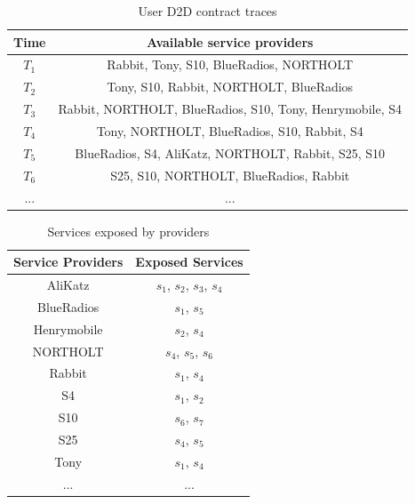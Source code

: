 \documentclass[journal]{IEEEtran}
\begin{document}
\begin{table}[!t]
\renewcommand{\arraystretch}{1.5}
\caption{User D2D contract traces}
\label{D2D contract traces}
\centering
\begin{tabular}{c c}
\hline
\bfseries Time & \bfseries Available service providers\\
\hline
$T_1$ & Rabbit, Tony, S10, BlueRadios, NORTHOLT\\
$T_2$ & Tony, S10, Rabbit, NORTHOLT, BlueRadios\\
$T_3$ & Rabbit, NORTHOLT, BlueRadios, S10, Tony, Henrymobile, S4 \\
$T_4$ & Tony, NORTHOLT, BlueRadios, S10, Rabbit, S4\\
$T_5$ & BlueRadios, S4, AliKatz, NORTHOLT, Rabbit, S25, S10\\
$T_6$ & S25, S10, NORTHOLT, BlueRadios, Rabbit\\
... & ...\\
\hline
\end{tabular}
\end{table}

\begin{table}[!t]
\renewcommand{\arraystretch}{1.3}
\caption{Services exposed by providers}
\label{Services exposed by providers}
\centering
\begin{tabular}{c c}
\hline
\bfseries Service Providers & \bfseries Exposed Services\\
\hline
AliKatz     & $s_1$, $s_2$, $s_3$, $s_4$\\
BlueRadios  & $s_1$, $s_5$\\
Henrymobile & $s_2$, $s_4$\\
NORTHOLT    & $s_4$, $s_5$, $s_6$ \\
Rabbit      & $s_1$, $s_4$\\
S4          & $s_1$, $s_2$\\
S10         & $s_6$, $s_7$\\
S25         & $s_4$, $s_5$\\
Tony        & $s_1$, $s_4$\\
... & ...\\
\hline
\end{tabular}
\end{table}
\end{document}
